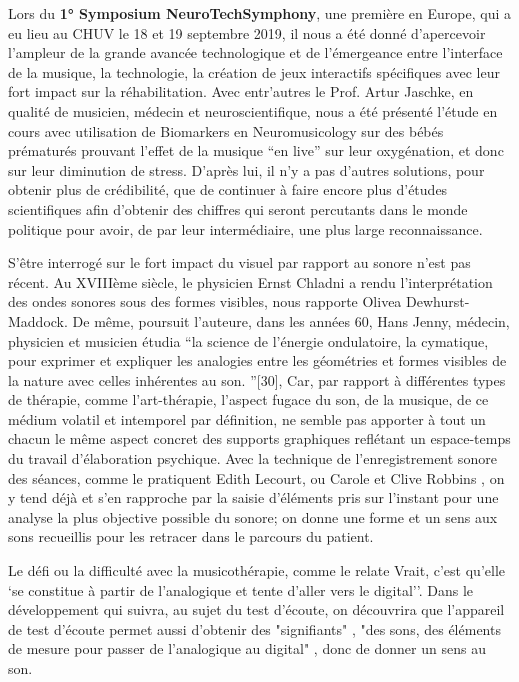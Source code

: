  Lors du \textbf{1° Symposium
 NeuroTechSymphony}, une première en Europe, qui a eu lieu au CHUV le 18 et 19 septembre 2019, il nous a été
 donné d'apercevoir l'ampleur de la grande avancée technologique
 et de l'émergeance entre l'interface de la musique, la technologie, la
 création de jeux interactifs spécifiques avec leur fort impact sur la
 réhabilitation. Avec entr'autres le Prof. Artur Jaschke, en qualité de musicien, médecin et neuroscientifique, nous a été présenté l'étude en cours avec utilisation de
Biomarkers en Neuromusicology sur des
bébés prématurés prouvant l'effet de la musique ``en live'' sur leur
oxygénation, et donc sur leur diminution de stress. D'après lui, il n'y a pas d'autres solutions, pour obtenir plus de crédibilité, que de continuer à faire encore plus d'études scientifiques afin d'obtenir des chiffres qui seront percutants dans le monde politique pour avoir, de par leur intermédiaire, une plus large reconnaissance.


S'être interrogé sur le fort impact du visuel par rapport au sonore n'est pas récent. Au XVIIIème siècle, le physicien Ernst Chladni a rendu l'interprétation des ondes sonores sous des formes visibles, nous rapporte Olivea Dewhurst-Maddock. De même, poursuit l'auteure, dans les années 60, Hans Jenny, médecin, physicien et musicien étudia  ``la science de l'énergie ondulatoire, la cymatique, pour exprimer et expliquer les analogies entre les géométries et formes visibles de la nature avec celles inhérentes au son. ''\autocite {Dewhurst}[30],
Car, par rapport à différentes types de thérapie, comme l'art-thérapie,
l'aspect fugace du son, de la musique, de ce médium volatil et
intemporel par
définition, ne semble pas apporter à tout un chacun le
même aspect concret des supports
graphiques
reflétant un espace-temps du travail d'élaboration
psychique.
Avec la technique de l'enregistrement sonore des séances, comme le pratiquent Edith
Lecourt, ou Carole et Clive
Robbins \autocite {lecourt_les_2017}, on y tend déjà et s'en rapproche par la saisie d'éléments pris sur l'instant pour une
analyse la plus objective possible du sonore; on donne
une forme et un sens aux sons recueillis pour les retracer dans le
parcours du patient.


 Le défi ou la difficulté avec la musicothérapie, comme le relate Vrait, c'est qu'elle  `se constitue à partir de l'analogique et tente d'aller vers le digital''\autocite[24]{vrait_musicotherapie_2018}.
Dans le développement qui suivra, au sujet du test d'écoute, on découvrira que l'appareil de test d'écoute permet aussi d'obtenir des "signifiants" , "des sons, des éléments de mesure pour passer de l'analogique au digital" \autocite[
24]{vrait_musicotherapie_2018}, donc de donner un sens au son.

